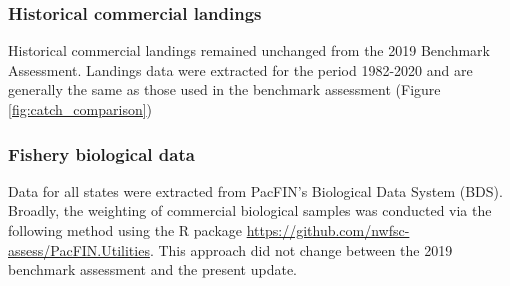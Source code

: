 \documentclass[11pt,
  english,
  a4paper,
]{article}
\begin{document}
\leavevmode\tagmcend\tagstructend


\hypertarget{historical-commercial-landings}{%
\subsubsection{Historical commercial landings}\label{historical-commercial-landings}}

\leavevmode\tagmcend\tagstructend


Historical commercial landings remained unchanged from the 2019 Benchmark Assessment. Landings data were extracted for the period 1982-2020 and are generally the same as those used in the benchmark assessment (Figure \ref{fig:catch_comparison})

\leavevmode\tagmcend\tagstructend\par


\hypertarget{fishery-biological-data}{%
\subsubsection{Fishery biological data}\label{fishery-biological-data}}

\leavevmode\tagmcend\tagstructend


Data for all states were extracted from PacFIN's Biological Data System (BDS). Broadly, the weighting of commercial biological samples was conducted via the following method using the R package {\href{PacFIN.Utilities}{https://github.com/nwfsc-assess/PacFIN.Utilities}\leavevmode\tagmcend\tagstructend}. This approach did not change between the 2019 benchmark assessment and the present update.

\leavevmode\tagmcend\tagstructend\par

\end{document}
